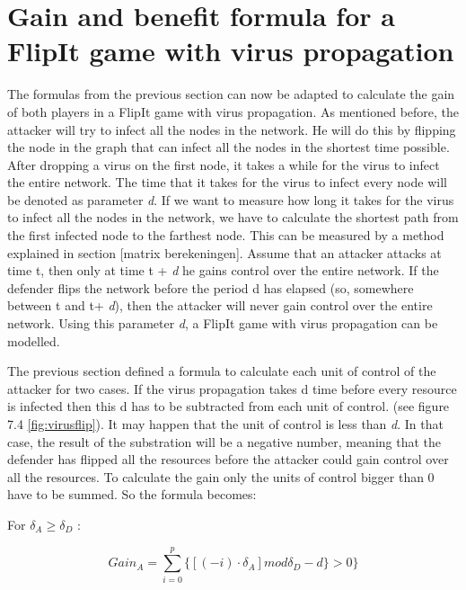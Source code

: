 \section{Gain and benefit formula for a FlipIt game with virus propagation}
\label{ch:8:GainVirus}
The formulas from the previous section can now be adapted to calculate the gain of both players in a FlipIt game with virus propagation. As mentioned before, the attacker will try to infect all the nodes in the network. He will do this by flipping the node in the graph that can infect all the nodes in the shortest time possible. After dropping a virus on the first node, it takes a while for the virus to infect the entire network. The time that it takes for the virus to infect every node will be denoted as parameter \textit{d}. If we want to measure how long it takes for the virus to infect all the nodes in the network, we have to calculate the shortest path from the
first infected node to the farthest node. This can be measured by a method explained in section [matrix berekeningen]. Assume that an attacker attacks at time t, then only at time t + \textit{d} he gains control over the entire network. If the defender flips the network before the period d has elapsed (so, somewhere between t and t+ \textit{d}), then the attacker will never gain control over the entire network. Using this parameter \textit{d}, a FlipIt game with virus propagation can be modelled.

The previous section defined a formula to calculate each unit of control of the attacker for two cases. If the virus propagation takes d time before every resource is infected then this d has to be subtracted from each unit of control. (see figure 7.4 \ref{fig:virusflip}). It may happen that the unit of control is less than \textit{d}. In that case, the result of the substration will be a negative number, meaning that the defender has flipped all the resources before the attacker could gain control over all the resources. To calculate the gain only the units of control bigger than 0 have to be summed. So the formula becomes: 


For $\delta_{A} \geq \delta_{D}$ :

\begin{equation}\label{first}
Gain_{A} = \sum_{i=0}^{p} \lbrace [( - i ) \cdot \delta_{A}] mod \delta_{D} - d \rbrace  > 0 \rbrace 
\end{equation}

